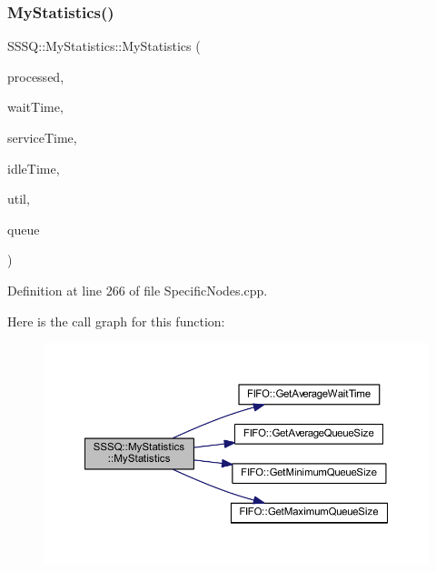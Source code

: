 \mbox{\label{class_s_s_s_q_1_1_my_statistics_af2e9214ebae8b846ae9beefbfb65f3de}} 
\subsubsection{\texorpdfstring{My\+Statistics()}{MyStatistics()}\hspace{0.1cm}{\footnotesize\ttfamily [2/2]}}
{\footnotesize\ttfamily S\+S\+S\+Q\+::\+My\+Statistics\+::\+My\+Statistics (\begin{DoxyParamCaption}\item[{int}]{processed,  }\item[{double}]{wait\+Time,  }\item[{double}]{service\+Time,  }\item[{double}]{idle\+Time,  }\item[{double}]{util,  }\item[{\hyperlink{class_f_i_f_o}{F\+I\+FO} $\ast$}]{queue }\end{DoxyParamCaption})\hspace{0.3cm}{\ttfamily [inline]}}



Definition at line 266 of file Specific\+Nodes.\+cpp.

Here is the call graph for this function\+:
\nopagebreak
\begin{figure}[H]
\begin{center}
\leavevmode
\includegraphics[width=350pt]{class_s_s_s_q_1_1_my_statistics_af2e9214ebae8b846ae9beefbfb65f3de_cgraph}
\end{center}
\end{figure}


